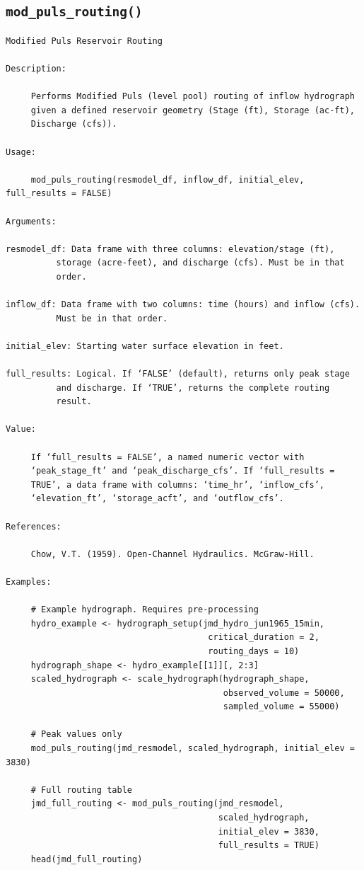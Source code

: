 \documentclass[
  letterpaper,
  DIV=11,
  numbers=noendperiod]{scrreprt}
\begin{document}
\subsection{\texorpdfstring{\texttt{mod\_puls\_routing()}}{mod\_puls\_routing()}}\label{mod_puls_routing}

\begin{verbatim}
Modified Puls Reservoir Routing

Description:

     Performs Modified Puls (level pool) routing of inflow hydrograph
     given a defined reservoir geometry (Stage (ft), Storage (ac-ft),
     Discharge (cfs)).

Usage:

     mod_puls_routing(resmodel_df, inflow_df, initial_elev, full_results = FALSE)
     
Arguments:

resmodel_df: Data frame with three columns: elevation/stage (ft),
          storage (acre-feet), and discharge (cfs). Must be in that
          order.

inflow_df: Data frame with two columns: time (hours) and inflow (cfs).
          Must be in that order.

initial_elev: Starting water surface elevation in feet.

full_results: Logical. If ‘FALSE’ (default), returns only peak stage
          and discharge. If ‘TRUE’, returns the complete routing
          result.

Value:

     If ‘full_results = FALSE’, a named numeric vector with
     ‘peak_stage_ft’ and ‘peak_discharge_cfs’. If ‘full_results =
     TRUE’, a data frame with columns: ‘time_hr’, ‘inflow_cfs’,
     ‘elevation_ft’, ‘storage_acft’, and ‘outflow_cfs’.

References:

     Chow, V.T. (1959). Open-Channel Hydraulics. McGraw-Hill.

Examples:

     # Example hydrograph. Requires pre-processing
     hydro_example <- hydrograph_setup(jmd_hydro_jun1965_15min,
                                        critical_duration = 2,
                                        routing_days = 10)
     hydrograph_shape <- hydro_example[[1]][, 2:3]
     scaled_hydrograph <- scale_hydrograph(hydrograph_shape,
                                           observed_volume = 50000,
                                           sampled_volume = 55000)
     
     # Peak values only
     mod_puls_routing(jmd_resmodel, scaled_hydrograph, initial_elev = 3830)
     
     # Full routing table
     jmd_full_routing <- mod_puls_routing(jmd_resmodel,
                                          scaled_hydrograph,
                                          initial_elev = 3830,
                                          full_results = TRUE)
     head(jmd_full_routing)
     
\end{verbatim}
\end{document}
